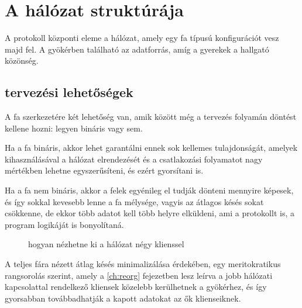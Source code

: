 \chapter{A h\'al\'ozat strukt\'ur\'aja}

A protokoll központi eleme a hálózat, amely egy fa típusú konfigurációt
vesz majd fel. A gyökérben található az adatforrás, amíg a gyerekek a
hallgató közönség.

\section{tervezési lehetőségek}
A fa szerkezetére két lehetőség van, amik között még a tervezés folyamán
döntést kellene hozni: legyen bináris vagy sem.

Ha a fa bináris, akkor lehet garantálni ennek sok kellemes tulajdonságát,
amelyek kihasználásával a hálózat elrendezését és a csatlakozási
folyamatot nagy mértékben lehetne egyszerűsíteni, és ezért gyorsítani is.

Ha a fa nem bináris, akkor a felek egyénileg el tudják dönteni mennyire
képesek, és így sokkal kevesebb lenne a fa mélysége, vagyis az átlagos
késés sokat csökkenne, de ekkor több adatot kell több helyre elküldeni,
ami a protokollt is, a program logikáját is bonyolítaná.

\begin{figure}

\caption{hogyan nézhetne ki a hálózat négy klienssel}
\end{figure}

A teljes fára nézett átlag késés minimalizálása érdekében, egy
meritokratikus rangsorolás szerint, amely a \ref{ch:reorg} fejezetben
lesz leírva a jobb hálózati kapcsolattal rendelkező kliensek közelebb
kerülhetnek a gyökérhez, és így gyorsabban továbbadhatják a kapott
adatokat az ők klienseiknek.



